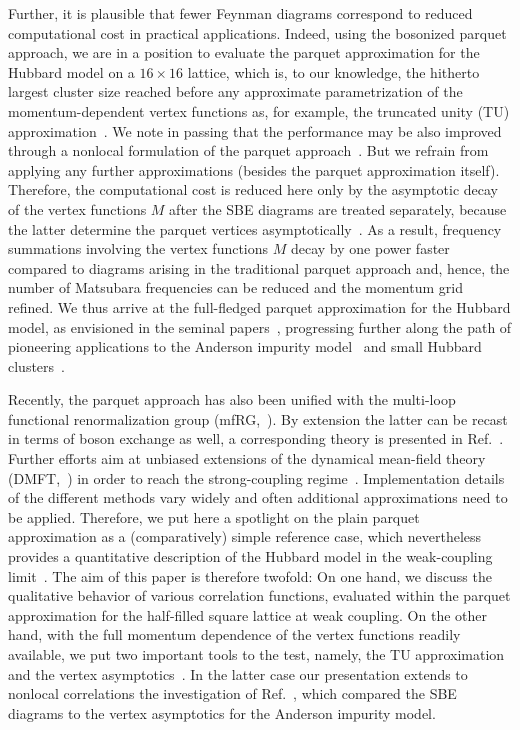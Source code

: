 \documentclass[epj]{svjour}
\begin{document}
Further, it is plausible that fewer Feynman diagrams correspond to reduced computational cost in practical applications.
Indeed, using the bosonized parquet approach, we are in a position to evaluate
the parquet approximation for the Hubbard model on a $16\times16$ lattice,
which is, to our knowledge, the hitherto largest cluster size reached before any approximate parametrization
of the momentum-dependent vertex functions as, for example, the truncated unity (TU) approximation~\cite{Husemann09,Wang12,Lichtenstein17,Eckhardt20}. We note in passing that the performance may be also improved
through a nonlocal formulation of the parquet approach~\cite{Krien20,Astretsov19}.
{But we refrain from applying any further approximations} (besides the parquet approximation itself).
Therefore, the computational cost is reduced here only by the asymptotic decay of the
vertex functions $M$ after the SBE diagrams are treated separately,
because the latter determine the parquet vertices asymptotically~\cite{Wentzell20}.
As a result, frequency summations involving the vertex functions $M$ decay by one power
faster compared to diagrams arising in the traditional parquet approach and, hence,
the number of Matsubara frequencies can be reduced and the momentum grid refined.
We thus arrive at the full-fledged parquet approximation for the Hubbard model,
as envisioned in the seminal papers~\cite{Diatlov57,Dominicis64-2}, progressing further along
the path of pioneering applications to the Anderson impurity model~\cite{Chen92} and small Hubbard clusters~\cite{Yang09, Tam13}.

Recently, the parquet approach has also been unified with the multi-loop functional renormalization group (mfRG,~\cite{Kugler18-3}).
By extension the latter can be recast in terms of boson exchange as well,
a corresponding theory is presented in Ref.~\cite{Walter22}.
Further efforts aim at unbiased extensions of the dynamical mean-field theory (DMFT,~\cite{Georges96})
in order to reach the strong-coupling regime~\cite{Toschi07,Taranto14,Rohringer18,Krien20}.
Implementation details of the different methods vary widely and often additional approximations need to be applied.
Therefore, we put here a spotlight on the plain parquet approximation as a (comparatively) simple reference case,
which nevertheless provides a quantitative description of the Hubbard model
in the weak-coupling limit~\cite{Hille20,Schaefer21}.
The aim of this paper is therefore twofold:
On one hand, we discuss the qualitative behavior of various correlation functions, evaluated within
the parquet approximation for the half-filled square lattice at weak coupling.
On the other hand, with the full momentum dependence of the vertex functions readily available,
we put two important tools to the test, namely,
the TU approximation~\cite{Eckhardt20} and the vertex asymptotics~\cite{Wentzell20}.
In the latter case our presentation extends to nonlocal correlations the investigation of Ref.~\cite{Harkov21},
which compared the SBE diagrams to the vertex asymptotics for the Anderson impurity model.
\end{document}
